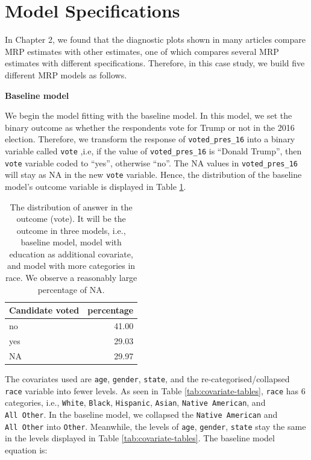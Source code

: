 \documentclass{monashthesis}
\begin{document}
\hypertarget{spec}{%
\section{Model Specifications}\label{spec}}

In Chapter 2, we found that the diagnostic plots shown in many articles compare MRP estimates with other estimates, one of which compares several MRP estimates with different specifications. Therefore, in this case study, we build five different MRP models as follows.

\newpage

\textbf{Baseline model}

We begin the model fitting with the baseline model. In this model, we set the binary outcome as whether the respondents vote for Trump or not in the 2016 election. Therefore, we transform the response of \texttt{voted\_pres\_16} into a binary variable called \texttt{vote} ,i.e, if the value of \texttt{voted\_pres\_16} is ``Donald Trump'', then \texttt{vote} variable coded to ``yes'', otherwise ``no''. The NA values in \texttt{voted\_pres\_16} will stay as NA in the new \texttt{vote} variable. Hence, the distribution of the baseline model's outcome variable is displayed in Table \ref{tab:vote-dist}.

\begin{table}

\caption{\label{tab:vote-dist}The distribution of answer in the outcome (vote). It will be the outcome in three models, i.e., baseline model, model with education as additional covariate, and model with more categories in race. We observe a reasonably large percentage of NA.}
\centering
\begin{tabular}[t]{lr}
\toprule
Candidate voted & percentage\\
\midrule
no & 41.00\\
yes & 29.03\\
NA & 29.97\\
\bottomrule
\end{tabular}
\end{table}

The covariates used are \texttt{age}, \texttt{gender}, \texttt{state}, and the re-categorised/collapsed \texttt{race} variable into fewer levels. As seen in Table \ref{tab:covariate-tables}, \texttt{race} has 6 categories, i.e., \texttt{White}, \texttt{Black}, \texttt{Hispanic}, \texttt{Asian}, \texttt{Native\ American}, and \texttt{All\ Other}. In the baseline model, we collapsed the \texttt{Native\ American} and \texttt{All\ Other} into \texttt{Other}. Meanwhile, the levels of \texttt{age}, \texttt{gender}, \texttt{state} stay the same in the levels displayed in Table \ref{tab:covariate-tables}. The baseline model equation is:
\end{document}
